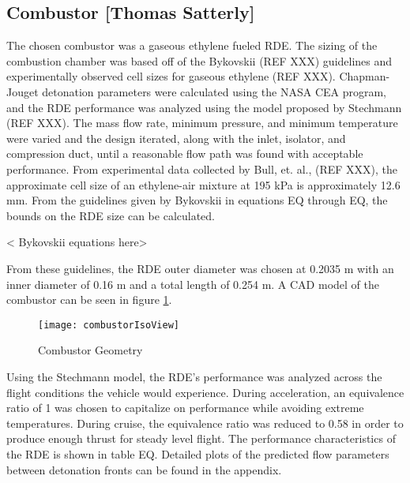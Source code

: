 \subsection{Combustor [Thomas Satterly]}
The chosen combustor was a gaseous ethylene fueled RDE. The sizing of the combustion chamber was based off of the Bykovskii (REF XXX) guidelines and experimentally observed cell sizes for gaseous ethylene (REF XXX). Chapman-Jouget detonation parameters were calculated using the NASA CEA program, and the RDE performance was analyzed using the model proposed by Stechmann (REF XXX). The mass flow rate, minimum pressure, and minimum temperature were varied and the design iterated, along with the inlet, isolator, and compression duct, until a reasonable flow path was found with acceptable performance. 
    From experimental data collected by Bull, et. al., (REF XXX), the approximate cell size of an ethylene-air mixture at 195 kPa is approximately 12.6 mm. From the guidelines given by Bykovskii in equations EQ through EQ, the bounds on the RDE size can be calculated.

< Bykovskii equations here>

    From these guidelines, the RDE outer diameter was chosen at 0.2035 m with an inner diameter of 0.16 m and a total length of 0.254 m. A CAD model of the combustor can be seen in figure \ref{fig:combustorIsoView}.

\begin{figure}[H]
\begin{center}
\texttt{[image: combustorIsoView]}
\caption{Combustor Geometry}
\label{fig:combustorIsoView}
\end{center}
\end{figure}

    Using the Stechmann model, the RDE’s performance was analyzed across the flight conditions the vehicle would experience. During acceleration, an equivalence ratio of 1 was chosen to capitalize on performance while avoiding extreme temperatures. During cruise, the equivalence ratio was reduced to 0.58 in order to produce enough thrust for steady level flight. The performance characteristics of the RDE is shown in table EQ. Detailed plots of the predicted flow parameters between detonation fronts can be found in the appendix.


